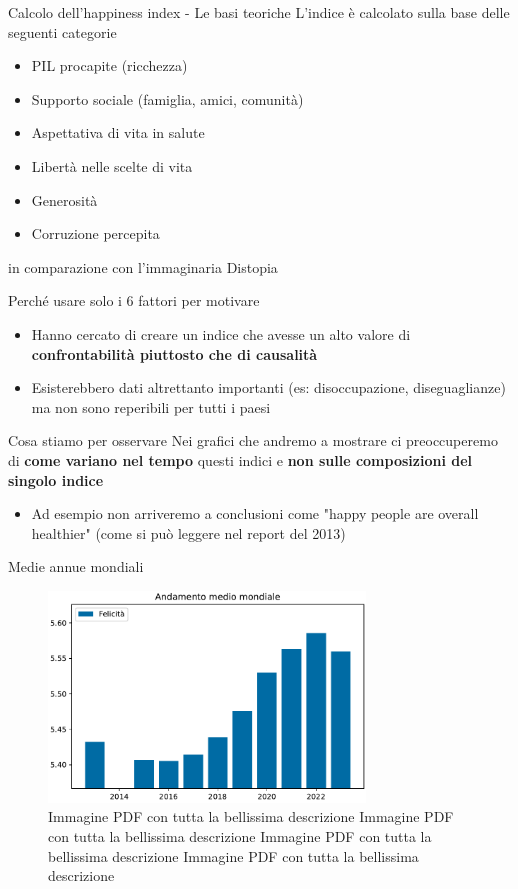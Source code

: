 \documentclass{beamer}
\begin{document}
\begin{frame}{Calcolo dell'happiness index - Le basi teoriche}
	L'indice è calcolato sulla base delle seguenti categorie
	\begin{itemize}
		\item PIL procapite (ricchezza)
		\item Supporto sociale (famiglia, amici, comunità)
		\item Aspettativa di vita in salute
		\item Libertà nelle scelte di vita
		\item Generosità
		\item Corruzione percepita
	\end{itemize}
	in comparazione con l'immaginaria Distopia
\end{frame}

\begin{frame}{Perché usare solo i 6 fattori per motivare}
	\begin{itemize}
		\item Hanno cercato di creare un indice che avesse un alto valore di \textbf{confrontabilità piuttosto che di causalità}
		\item Esisterebbero dati altrettanto importanti (es: disoccupazione, diseguaglianze) ma non sono reperibili per tutti i paesi
	\end{itemize}
\end{frame}

\begin{frame}{Cosa stiamo per osservare}
	Nei grafici che andremo a mostrare ci preoccuperemo di \textbf{come variano nel tempo} questi indici e \textbf{non sulle composizioni del singolo indice}
	\begin{itemize}
		\item Ad esempio non arriveremo a conclusioni come "happy people are overall healthier" (come si può leggere nel report del 2013)
	\end{itemize}
\end{frame}

\begin{frame}{Medie annue mondiali}
	\begin{figure}
		\centering
		\includegraphics[width=0.75\textwidth]{"./img/1medieAnnue.pdf"}
		\caption{Immagine PDF con tutta la bellissima descrizione Immagine PDF con tutta la bellissima descrizione Immagine PDF con tutta la bellissima descrizione Immagine PDF con tutta la bellissima descrizione }
		\label{fig:pdf}
	\end{figure}
\end{frame}
\end{document}
